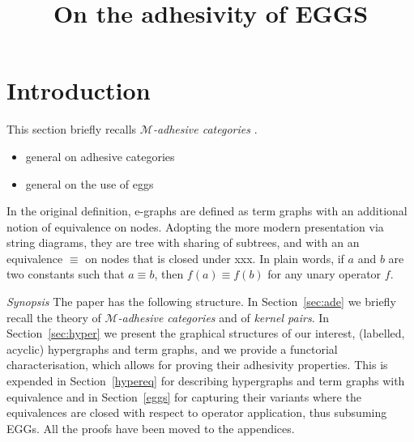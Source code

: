 \documentclass[a4paper,UKenglish,cleveref,pdftex,thm-restate,numberwithinsect]{lipics-v2021}
\title{On the adhesivity of EGGS}
\begin{document}

\maketitle 

\begin{abstract}
\end{abstract}


\section{Introduction}

This  section briefly recalls \emph{$\mathcal{M}$-adhesive categories} \cite{azzi2019essence,ehrig2012,ehrig2014adhesive,lack2005adhesive,heindel2009category}. 


\begin{itemize}
\item general on adhesive categories
\item general on the use of eggs
\end{itemize}

In the original definition, e-graphs are defined as term graphs with an additional notion of equivalence on nodes. 
Adopting the more modern presentation via string diagrams, they are tree with sharing of subtrees, and with an 
an equivalence $\equiv$ on nodes that is closed under xxx. In plain words, if $a$ and $b$ are two constants such that
$a \equiv b$, then $f(a) \equiv f(b)$ for any unary operator $f$.

\cite[Section~4.2]{DetlefsNS05}
\cite{WillseyNWFTP21}


\emph{Synopsis}
The paper has the following structure. 
In Section~\ref{sec:ade} we briefly recall 
the theory of
\emph{$\mathcal{M}$-adhesive categories}
and of \emph{kernel pairs}.
In Section~\ref{sec:hyper} we present the graphical structures of our interest, 
 (labelled, acyclic) hypergraphs and term graphs, and we provide a
functorial characterisation, which allows for proving their adhesivity properties.
This is expended in Section~\ref{hypereq} for describing hypergraphs 
and term graphs with equivalence and in Section~\ref{eggs} for capturing
their variants where the equivalences are closed with respect to operator application,
thus subsuming EGGs.
%
All the proofs have been moved to the appendices. 
\end{document}
